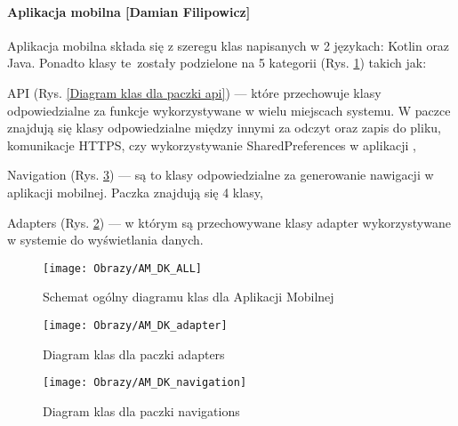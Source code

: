 \documentclass[twoside,10pt]{article}
\begin{document}
\paragraph*{Aplikacja mobilna [Damian Filipowicz]}
Aplikacja mobilna składa się z szeregu klas napisanych w 2 językach: Kotlin oraz Java. Ponadto klasy te~zostały podzielone na 5 kategorii (Rys. \ref{Schemat ogólny diagramu klas dla Aplikacji mobilnej}) takich jak:

\begin{itemize*}
\item API 
(Rys. \ref{Diagram klas dla paczki api}) 
---  które przechowuje klasy odpowiedzialne za funkcje wykorzystywane w wielu miejscach systemu. W paczce znajdują się klasy odpowiedzialne między innymi za odczyt oraz zapis do pliku, komunikacje HTTPS, czy wykorzystywanie SharedPreferences w aplikacji ,
\item Navigation 
(Rys. \ref{Diagram klas dla paczki navigations}) 
--- są to klasy odpowiedzialne za generowanie nawigacji w aplikacji mobilnej. Paczka znajdują się 4 klasy,
\item Adapters
(Rys. \ref{Diagram klas dla paczki adapters}) 
--- w którym są przechowywane klasy adapter wykorzystywane w systemie do wyświetlania danych.
\end{itemize*}

\begin{figure}[ht!]
\centering
\vspace{-0.6cm}
\texttt{[image: Obrazy/AM\_DK\_ALL]}
\caption{Schemat ogólny diagramu klas dla Aplikacji Mobilnej}
\label{Schemat ogólny diagramu klas dla Aplikacji mobilnej}
\end{figure}
\newpage
\begin{figure}[ht!]
\centering
\texttt{[image: Obrazy/AM\_DK\_adapter]}
\caption{Diagram klas dla paczki adapters}
\label{Diagram klas dla paczki adapters}
\end{figure}
\newpage
\begin{figure}[ht!]
\centering
\texttt{[image: Obrazy/AM\_DK\_navigation]}
\caption{Diagram klas dla paczki navigations}
\label{Diagram klas dla paczki navigations}
\end{figure}
\end{document}
